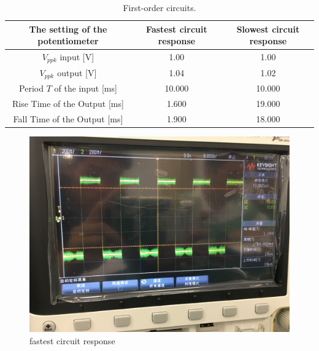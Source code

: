 \documentclass{article}
\begin{document}
\begin{table}[!h]

\begin{center}

\begin{tabular}{|c|c|c|}

\hline

The setting of the potentiometer  & Fastest circuit response & Slowest circuit response \\

\hline

$V_{ppk}$ input [V]		&	1.00	&	1.00	\\

\hline

$V_{ppk}$ output [V]	&	1.04	&	1.02	\\

\hline

Period $T$ of the input [ms]	&	10.000	&	10.000	\\

\hline

Rise Time of the Output [ms]	&	1.600	&	19.000	\\

\hline

Fall Time of the Output [ms]	&	1.900	&	18.000	\\

\hline

\end{tabular}
\caption{First-order circuits.}
\label{tab-1}
\end{center}
\end{table}
  \begin{figure}[H]
  \centering
  \includegraphics[width=.6\textwidth]{Figure2.jpg}
  \caption{fastest circuit response}
  \label{img} 
\end{figure}
\end{document}
